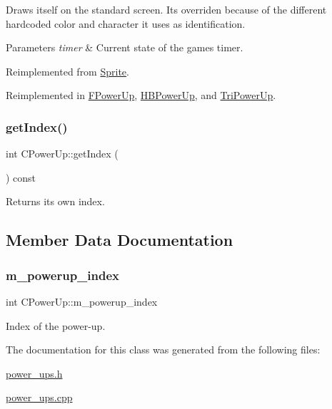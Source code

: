 Draws itself on the standard screen. It\textquotesingle{}s overriden because of the different hardcoded color and character it uses as identification.


\begin{DoxyParams}{Parameters}
{\em timer} & Current state of the game\textquotesingle{}s timer. \\
\hline
\end{DoxyParams}


Reimplemented from \hyperlink{classSprite_aa41512617e8a1626bade15cbbdfb3f79}{Sprite}.



Reimplemented in \hyperlink{classFPowerUp_aaf83782b032f53dacd37650127595148}{F\+Power\+Up}, \hyperlink{classHBPowerUp_ac9fcb7d3ef5f3a0561ffe0b6689944a1}{H\+B\+Power\+Up}, and \hyperlink{classTriPowerUp_a06af18b739589c56a90da91716243acf}{Tri\+Power\+Up}.

\mbox{\label{classCPowerUp_ac934e9e2bebc680caf63c125f75178a8}} 
\subsubsection{\texorpdfstring{get\+Index()}{getIndex()}}
{\footnotesize\ttfamily int C\+Power\+Up\+::get\+Index (\begin{DoxyParamCaption}{ }\end{DoxyParamCaption}) const}



Returns it\textquotesingle{}s own index. 



\subsection{Member Data Documentation}
\mbox{\label{classCPowerUp_aa8b01cf91f7b24d6d555ae32071bb3bc}} 
\subsubsection{\texorpdfstring{m\+\_\+powerup\+\_\+index}{m\_powerup\_index}}
{\footnotesize\ttfamily int C\+Power\+Up\+::m\+\_\+powerup\+\_\+index\hspace{0.3cm}{\ttfamily [protected]}}



Index of the power-\/up. 



The documentation for this class was generated from the following files\+:\begin{DoxyCompactItemize}
\item 
\hyperlink{power__ups_8h}{power\+\_\+ups.\+h}\item 
\hyperlink{power__ups_8cpp}{power\+\_\+ups.\+cpp}\end{DoxyCompactItemize}

